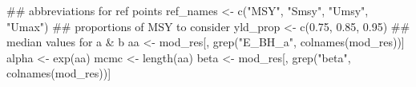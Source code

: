 \documentclass[11pt,]{article}
\newenvironment{Shaded}{}{}
\newcommand{\CommentTok}[1]{\textcolor[rgb]{0.00,0.50,0.00}{#1}}
\newcommand{\FloatTok}[1]{#1}
\newcommand{\KeywordTok}[1]{\textcolor[rgb]{0.00,0.00,1.00}{#1}}
\newcommand{\NormalTok}[1]{#1}
\newcommand{\StringTok}[1]{\textcolor[rgb]{0.00,0.50,0.50}{#1}}
\begin{document}
\begin{Shaded}
\begin{Highlighting}[]
\CommentTok{## abbreviations for ref points}
\NormalTok{ref_names <-}\StringTok{ }\KeywordTok{c}\NormalTok{(}\StringTok{"MSY"}\NormalTok{, }\StringTok{"Smsy"}\NormalTok{, }\StringTok{"Umsy"}\NormalTok{, }\StringTok{"Umax"}\NormalTok{)}
\CommentTok{## proportions of MSY to consider}
\NormalTok{yld_prop <-}\StringTok{ }\KeywordTok{c}\NormalTok{(}\FloatTok{0.75}\NormalTok{, }\FloatTok{0.85}\NormalTok{, }\FloatTok{0.95}\NormalTok{)}
\CommentTok{## median values for a & b}
\NormalTok{aa <-}\StringTok{ }\NormalTok{mod_res[, }\KeywordTok{grep}\NormalTok{(}\StringTok{"E_BH_a"}\NormalTok{, }\KeywordTok{colnames}\NormalTok{(mod_res))]}
\NormalTok{alpha <-}\StringTok{ }\KeywordTok{exp}\NormalTok{(aa)}
\NormalTok{mcmc <-}\StringTok{ }\KeywordTok{length}\NormalTok{(aa)}
\NormalTok{beta <-}\StringTok{ }\NormalTok{mod_res[, }\KeywordTok{grep}\NormalTok{(}\StringTok{"beta"}\NormalTok{, }\KeywordTok{colnames}\NormalTok{(mod_res))]}


\end{Highlighting}
\end{Shaded}
\end{document}
